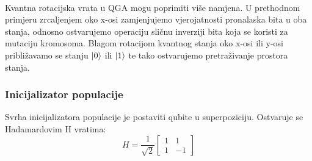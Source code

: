 \documentclass[times, utf8, zavrsni, numeric]{fer}
\begin{document}
\paragraph{}
Kvantna rotacijska vrata u QGA mogu poprimiti više namjena. U prethodnom primjeru zrcaljenjem oko x-osi zamjenjujemo vjerojatnosti pronalaska bita u oba stanja, odnosno ostvarujemo operaciju sličnu inverziji bita koja se koristi za mutaciju kromosoma. Blagom rotacijom kvantnog stanja oko x-osi ili y-osi približavamo se stanju $\ket{0}$ ili $\ket{1}$ te tako ostvarujemo pretraživanje prostora stanja.

\subsubsection{Inicijalizator populacije}
Svrha inicijalizatora populacije je postaviti qubite u superpoziciju. Ostvaruje se Hadamardovim H vratima:
\begin{equation}
H = \frac{1}{\sqrt{2}}
\begin{bmatrix}
1 & 1 \\ 1 & -1
\end{bmatrix} 
\end{equation}
\end{document}
